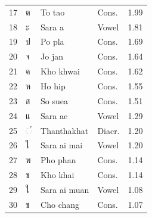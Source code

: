 \documentclass[10pt,twocolumn,a4paper]{article}
\newcommand{\thai}[1]{{\thaifont #1}}
\begin{document}
\begin{table}[t]
\begin{tabular}{@{}rlllr@{}}
17 & \thai{ต}  & To tao        & Cons. & 1.99 \\
18 & \thai{ะ}  & Sara a        & Vowel & 1.81 \\
19 & \thai{ป}  & Po pla        & Cons. & 1.69 \\
20 & \thai{จ}  & Jo jan        & Cons. & 1.64 \\
21 & \thai{ค}  & Kho khwai     & Cons. & 1.62 \\
22 & \thai{ห}  & Ho hip        & Cons. & 1.55 \\
23 & \thai{ส}  & So suea       & Cons. & 1.51 \\
24 & \thai{แ}  & Sara ae       & Vowel & 1.29 \\
25 & \thai{◌์} & Thanthakhat   & Diacr.& 1.20 \\
26 & \thai{ไ}  & Sara ai mai   & Vowel & 1.20 \\
27 & \thai{พ}  & Pho phan      & Cons. & 1.14 \\
28 & \thai{ข}  & Kho khai      & Cons. & 1.14 \\
29 & \thai{ใ}  & Sara ai muan  & Vowel & 1.08 \\
30 & \thai{ช}  & Cho chang     & Cons. & 1.07 \\
\bottomrule
\end{tabular}
\end{table}
\end{document}
